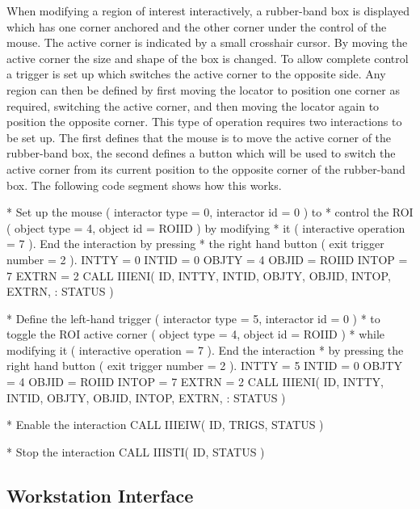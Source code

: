 \documentclass[11pt,nolof]{starlink}
\begin{document}
When modifying a region of interest interactively, a rubber-band box
is displayed which has one corner anchored and the other corner under
the control of the mouse. The active corner is indicated by a small
crosshair cursor. By moving the active corner the size and shape of the
box is changed. To allow complete control a trigger is set up which
switches the active corner to the opposite side. Any region can then be
defined by first moving the locator to position one corner as required,
switching the active corner, and then moving the locator again to position
the opposite corner. This type of operation requires two interactions to be
set up. The first defines that the mouse is to move the active
corner of the rubber-band box, the second defines a button which will
be used to switch the active corner from its current position to the
opposite corner of the rubber-band box.
The following code segment shows how this works.
\begin{small}
\begin{terminalv}
*   Set up the mouse ( interactor type = 0, interactor id = 0 ) to
*   control the ROI ( object type = 4, object id = ROIID ) by modifying
*   it ( interactive operation = 7 ). End the interaction by pressing
*   the right hand button ( exit trigger number = 2 ).
      INTTY = 0
      INTID = 0
      OBJTY = 4
      OBJID = ROIID
      INTOP = 7
      EXTRN = 2
      CALL IIIENI( ID, INTTY, INTID, OBJTY, OBJID, INTOP, EXTRN,
     :             STATUS )

*   Define the left-hand trigger ( interactor type = 5, interactor id = 0 )
*   to toggle the ROI active corner ( object type = 4, object id = ROIID )
*   while modifying it ( interactive operation = 7 ). End the interaction
*   by pressing the right hand button ( exit trigger number = 2 ).
      INTTY = 5
      INTID = 0
      OBJTY = 4
      OBJID = ROIID
      INTOP = 7
      EXTRN = 2
      CALL IIIENI( ID, INTTY, INTID, OBJTY, OBJID, INTOP, EXTRN,
     :             STATUS )

*   Enable the interaction
      CALL IIIEIW( ID, TRIGS, STATUS )

*   Stop the interaction
      CALL IIISTI( ID, STATUS )
\end{terminalv}
\end{small}

\subsection{Workstation Interface}
\end{document}
